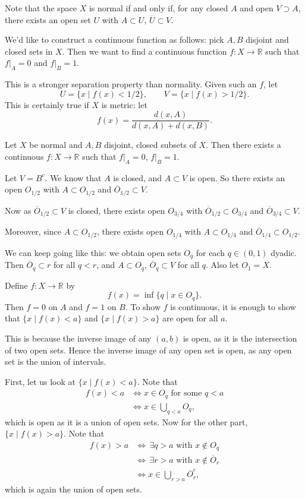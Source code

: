 \documentclass[12pt]{article}
\begin{document}
Note that the space $X$ is normal if and only if, for any closed $A$ and open $V \supset A$, there exists an open set $U$ with $A \subset U$, $\overline{U} \subset V$.

We'd like to construct a continuous function as follows: pick $A, B$ disjoint and closed sets in $X$. Then we want to find a continuous function $f : X \to \mathbb{R}$ such that $f|_A = 0$ and $f|_B = 1$.

This is a stronger separation property than normality. Given such an $f$, let
\[
	U = \{x \mid f(x) < 1/2\}, \qquad V = \{x \mid f(x) > 1/2\}.
\]
This is certainly true if $X$ is metric: let
\[
f(x) = \frac{d(x, A)}{d(x, A) + d(x, B)}.
\]

\begin{theorem}
	Let $X$ be normal and $A, B$ disjoint, closed subsets of $X$. Then there exists a continuous $f : X \to \mathbb{R}$ such that $f|_A = 0$, $f|_B = 1$.
\end{theorem}

\begin{proofbox}
	Let $V = B^{c}$. We know that $A$ is closed, and $A \subset V$ is open. So there exists an open $O_{1/2}$ with $A \subset O_{1/2}$ and $\overline{O}_{1/2} \subset V$.

	Now as $\overline{O}_{1/2} \subset V$ is closed, there exists open $O_{3/4}$ with $\overline{O}_{1/2} \subset O_{3/4}$ and $\overline{O}_{3/4} \subset V$.

	Moreover, since $A \subset O_{1/2}$, there exists open $O_{1/4}$ with $A \subset O_{1/4}$ and $\overline{O}_{1/4} \subset O_{1/2}$.

	We can keep going like this: we obtain open sets $O_q$ for each $q \in (0, 1)$ dyadic. Then $\overline{O}_q \subset r$ for all $q < r$, and $A\subset O_q$, $\overline{O}_q \subset V$ for all $q$. Also let $O_1 = X$.

	Define $f : X \to \mathbb{R}$ by
	\[
		f(x) = \inf \{q \mid x \in O_q\}.
	\]
	Then $f = 0$ on $A$ and $f = 1$ on $B$. To show $f$ is continuous, it is enough to show that $\{x \mid f(x) < a\}$ and $\{x \mid f(x) > a\}$ are open for all $a$.

	This is because the inverse image of any $(a, b)$ is open, as it is the intersection of two open sets. Hence the inverse image of any open set is open, as any open set is the union of intervals.

	First, let us look at $\{x \mid f(x) < a\}$. Note that
	\begin{align*}
		f(x) < a &\iff x \in O_q \text{ for some } q < a\\
			 &\iff x \in \bigcup_{q < a} O_q,
	\end{align*}
	which is open as it is a union of open sets. Now for the other part, $\{x \mid f(x) > a\}$. Note that
	\begin{align*}
		f(x) > a &\iff \,\exists q > a \text{ with } x \not \in O_q \\
			 &\iff \, \exists r > a \text{ with } x \not \in \overline{O}_r \\
			 &\iff x \in \bigcup_{r > a}\overline{O}_r^{c},
	\end{align*}
	which is again the union of open sets.
\end{proofbox}
\end{document}
